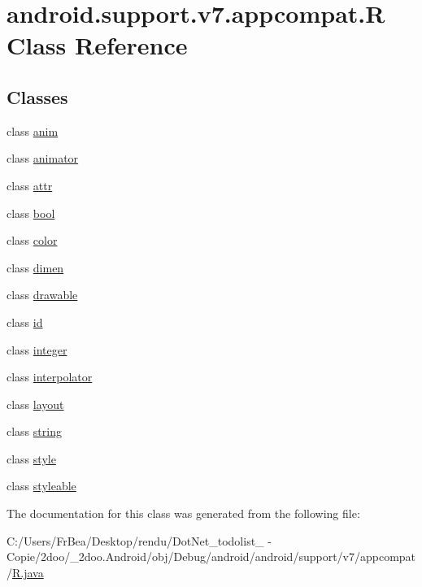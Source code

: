 \hypertarget{classandroid_1_1support_1_1v7_1_1appcompat_1_1_r}{
\section{android.support.v7.appcompat.R Class Reference}
\label{classandroid_1_1support_1_1v7_1_1appcompat_1_1_r}
}
\subsection*{Classes}
\begin{CompactItemize}
\item 
class \hyperlink{classandroid_1_1support_1_1v7_1_1appcompat_1_1_r_1_1anim}{anim}
\item 
class \hyperlink{classandroid_1_1support_1_1v7_1_1appcompat_1_1_r_1_1animator}{animator}
\item 
class \hyperlink{classandroid_1_1support_1_1v7_1_1appcompat_1_1_r_1_1attr}{attr}
\item 
class \hyperlink{classandroid_1_1support_1_1v7_1_1appcompat_1_1_r_1_1bool}{bool}
\item 
class \hyperlink{classandroid_1_1support_1_1v7_1_1appcompat_1_1_r_1_1color}{color}
\item 
class \hyperlink{classandroid_1_1support_1_1v7_1_1appcompat_1_1_r_1_1dimen}{dimen}
\item 
class \hyperlink{classandroid_1_1support_1_1v7_1_1appcompat_1_1_r_1_1drawable}{drawable}
\item 
class \hyperlink{classandroid_1_1support_1_1v7_1_1appcompat_1_1_r_1_1id}{id}
\item 
class \hyperlink{classandroid_1_1support_1_1v7_1_1appcompat_1_1_r_1_1integer}{integer}
\item 
class \hyperlink{classandroid_1_1support_1_1v7_1_1appcompat_1_1_r_1_1interpolator}{interpolator}
\item 
class \hyperlink{classandroid_1_1support_1_1v7_1_1appcompat_1_1_r_1_1layout}{layout}
\item 
class \hyperlink{classandroid_1_1support_1_1v7_1_1appcompat_1_1_r_1_1string}{string}
\item 
class \hyperlink{classandroid_1_1support_1_1v7_1_1appcompat_1_1_r_1_1style}{style}
\item 
class \hyperlink{classandroid_1_1support_1_1v7_1_1appcompat_1_1_r_1_1styleable}{styleable}
\end{CompactItemize}


The documentation for this class was generated from the following file:\begin{CompactItemize}
\item 
C:/Users/FrBea/Desktop/rendu/DotNet\_\-todolist\_ - Copie/2doo/\_\-2doo.Android/obj/Debug/android/android/support/v7/appcompat/\hyperlink{android_2support_2v7_2appcompat_2_r_8java}{R.java}\end{CompactItemize}
